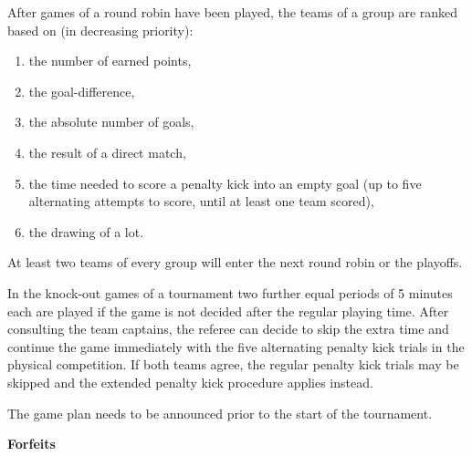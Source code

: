 \bigskip

After games of a round robin have been played, the teams of a group are ranked based on (in decreasing priority): 

\begin{enumerate}
\item the number of earned points,
\item the goal-difference,
\item the absolute number of goals,
\item the result of a direct match,
\item the time needed to score a penalty kick into an empty goal (up to five alternating attempts to score, until at least one team scored),
\item the drawing of a lot.
\end{enumerate}

\bigskip


At least two teams of every group will enter the next round robin or the playoffs.

\bigskip

In the knock-out games of a tournament two further equal periods of 5 minutes each are played if the game is not decided after the regular playing time.  After consulting the team captains, the referee can decide to skip the extra time and continue the game immediately with the five alternating penalty kick trials in the physical competition. If both teams agree, the regular penalty kick trials may be skipped and the extended penalty kick procedure applies instead.

\bigskip


The game plan needs to be announced prior to the start of the tournament.


\bigskip

{\bfseries Forfeits}

\headlinebox

